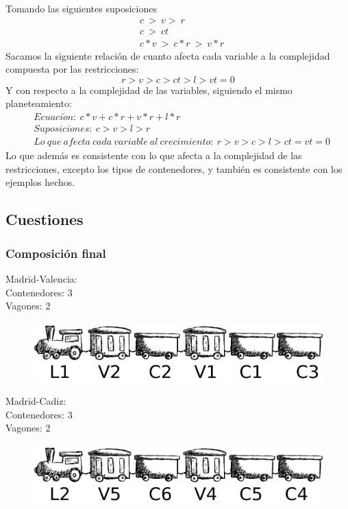 \documentclass[11pt,spanish]{article}
\begin{document}
		Tomando las siguientes suposiciones
		\begin{align*}
			&c\ >\ v >\ r\\
			&c\ >\ ct\\
			&c*v\ >\ c*r\ >\ v*r
		\end{align*}
		Sacamos la siguiente relación de cuanto afecta cada variable a la complejidad compuesta por las restricciones:\\
		$$r>v>c>ct>l>vt = 0$$
		Y con respecto a la complejidad de las variables, siguiendo el mismo planeteamiento:
		\begin{align*}
			&Ecuaci\acute{o}n:\ c*v+c*r+v*r+l*r\\
			&Suposiciones:\ c > v > l > r\\
			&Lo\ que\ afecta\ cada\ variable\ al\ crecimiento:\ r > v > c > l > ct = vt = 0
		\end{align*}
		Lo que además es consistente con lo que afecta a la complejidad de las restricciones, excepto los tipos de contenedores, y también es consistente con los ejemplos hechos.
		\subsection{Cuestiones}
			\subsubsection{Composición final}
			\begin{tabbing}
			Madr\=id-Valencia:\\
			\>Contenedores: 3\\
			\>Vagones: 2
			\end{tabbing}
			\begin{figure}[h!]
				\includegraphics[width=0.8\linewidth]{MadricValencia.png}
			\end{figure}
			\begin{tabbing}
			Madr\=id-Cadiz:\\
			\>Contenedores: 3\\
			\>Vagones: 2
			\end{tabbing}
			\begin{figure}[h!]
				\includegraphics[width=0.8\linewidth]{MadricCadiz.png}
			\end{figure}
\end{document}
